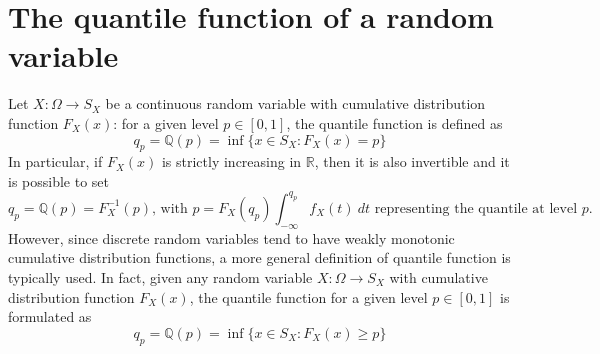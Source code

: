 \documentclass{report}
\begin{document}
\section{The quantile function of a random variable}
Let $\displaystyle X: \Omega \to S_X$ be a continuous random variable with cumulative distribution function $\displaystyle F_X(x)$: for a given level $\displaystyle p \in [0, 1]$, the quantile function is defined as
\[q_p = \mathbb{Q}(p) = \inf\{x \in S_X: F_X(x) = p\}\]
In particular, if $\displaystyle F_X(x)$ is strictly increasing in $\displaystyle \mathbb{R}$, then it is also invertible and it is possible to set
\[q_p = \mathbb{Q}(p) = F_X^{-1}(p) \text{, with } p = F_X(q_p) \int_{-\infty}^{q_p} f_X(t) \ dt \text{ representing the quantile at level $p$.}\]
However, since discrete random variables tend to have weakly monotonic cumulative distribution functions, a more general definition of quantile function is typically used. \newline
In fact, given any random variable $\displaystyle X: \Omega \to S_X$ with cumulative distribution function $\displaystyle F_X(x)$, the quantile function for a given level $\displaystyle p \in [0, 1]$ is formulated as
\[q_p = \mathbb{Q}(p) = \inf\{x \in S_X : F_X(x) \ge p\}\]
\end{document}
